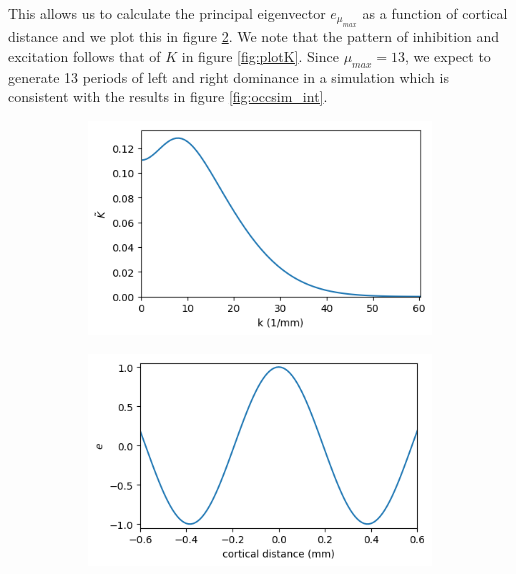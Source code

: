 \documentclass{article}
\begin{document}
This allows us to calculate the principal eigenvector $e_{\mu_{max}}$ as a function of cortical distance and we plot this in figure \ref{fig:eigvec}. We note that the pattern of inhibition and excitation follows that of $K$ in figure \ref{fig:plotK}.
Since $\mu_{max}=13$, we expect to generate 13 periods of left and right dominance in a simulation which is consistent with the results in figure \ref{fig:occsim_int}. 

\begin{figure}[h]
	\centering
	\begin{subfigure}[t]{0.35\linewidth}
		\centering
		\includegraphics[width = 1.0\linewidth, trim={0 0 0 0}, clip=true]{figures/plot_Ktilde.png}
		\label{fig:Ktilde}	
	\end{subfigure}%
	\hspace{0.1\linewidth}
	\begin{subfigure}[t]{0.35\linewidth}
		\centering
		\includegraphics[width = 1.0\linewidth, trim={0 0 0 0}, clip=true]{figures/plot_eigvec.png}
		\label{fig:eigvec}	
	\end{subfigure}%
\caption{}
\label{}
\end{figure}
\end{document}
